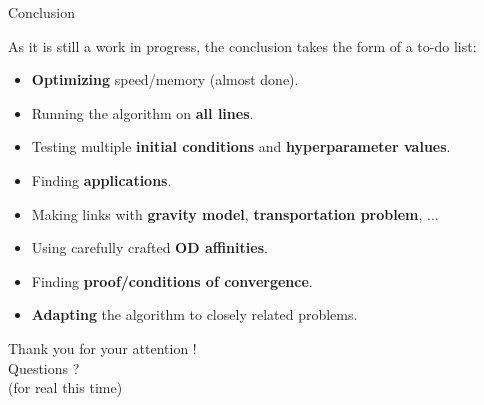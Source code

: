 \documentclass[10pt]{beamer}
\newcommand{\imp}[1]{\textbf{\color{cyan}#1}}
\begin{document}
	\begin{frame}{Conclusion}
		
		As it is still a work in progress, the conclusion takes the form of a to-do list:
		\begin{itemize}
			\item \imp{Optimizing} speed/memory (almost done).
			\item Running the algorithm on \imp{all lines}.
			\item Testing multiple \imp{initial conditions} and \imp{hyperparameter values}.  
			\item Finding \imp{applications}.
			\item Making links with \imp{gravity model}, \imp{transportation problem}, ...
			\item Using carefully crafted \imp{OD affinities}.
			\item Finding \imp{proof/conditions of convergence}.
			\item \imp{Adapting} the algorithm to closely related problems.
		\end{itemize}
		
	\end{frame}

	
	
	\begin{frame}
		
		\begin{center}
			\huge Thank you for your attention ! \\
			Questions ? \\
			\vspace{1cm}
			\small
			(for real this time)
		\end{center}
		
		
	\end{frame}
	
	
\end{document}
